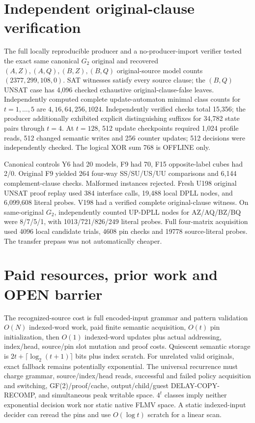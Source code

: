 \documentclass[11pt]{article}
\begin{document}
\section{Independent original-clause verification}
The full locally reproducible producer and a no-producer-import verifier tested the exact same canonical $G_2$ original and recovered $(A,Z),(A,Q),(B,Z),(B,Q)$ original-source model counts $(2377,299,108,0)$. SAT witnesses satisfy every source clause; the $(B,Q)$ UNSAT case has 4,096 checked exhaustive original-clause-false leaves. Independently computed complete update-automaton minimal class counts for $t=1,\ldots,5$ are $4,16,64,256,1024$. Independently verified checks total 15,356; the producer additionally exhibited explicit distinguishing suffixes for 34,782 state pairs through $t=4$. At $t=128$, 512 update checkpoints required 1,024 profile reads, 512 changed semantic writes and 256 counter updates; 512 decisions were independently checked. The logical XOR sum 768 is OFFLINE only.

Canonical controls Y6 had 20 models, F9 had 70, F15 opposite-label cubes had 2/0. Original F9 yielded 264 four-way SS/SU/US/UU comparisons and 6,144 complement-clause checks. Malformed instances rejected. Fresh U198 original UNSAT proof replay used 384 interface calls, 19,488 local DPLL nodes, and 6,099,608 literal probes. V198 had a verified complete original-clause witness. On same-original $G_2$, independently counted UP-DPLL nodes for AZ/AQ/BZ/BQ were 8/7/5/1, with 1013/721/826/249 literal probes. Full four-matrix acquisition used 4096 local candidate trials, 4608 pin checks and 19778 source-literal probes. The transfer prepass was not automatically cheaper.

\section{Paid resources, prior work and OPEN barrier}
The recognized-source cost is full encoded-input grammar and pattern validation $O(N)$ indexed-word work, paid finite semantic acquisition, $O(t)$ pin initialization, then $O(1)$ indexed-word updates plus actual addressing, index/head, source/pin slot mutation and proof costs. Quiescent semantic storage is $2t+\lceil\log_2(t+1)\rceil$ bits plus index scratch. For unrelated valid originals, exact fallback remains potentially exponential. The universal recurrence must charge grammar, source/index/head reads, successful and failed policy acquisition and switching, GF(2)/proof/cache, output/child/guest DELAY-COPY-RECOMP, and simultaneous peak writable space. $4^t$ classes imply neither exponential decision work nor static native FLMV space. A static indexed-input decider can reread the pins and use $O(\log t)$ scratch for a linear scan.
\end{document}
